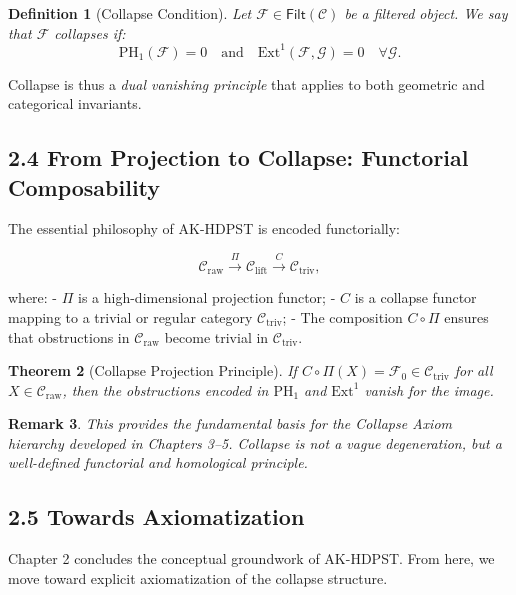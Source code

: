 \documentclass[11pt]{article}
\newtheorem{theorem}{Theorem}[section]
\newtheorem{definition}[theorem]{Definition}
\newtheorem{remark}[theorem]{Remark}
\begin{document}
\begin{definition}[Collapse Condition]
Let \( \mathcal{F} \in \mathsf{Filt}(\mathcal{C}) \) be a filtered object.  
We say that \( \mathcal{F} \) \emph{collapses} if:
\[
\mathrm{PH}_1(\mathcal{F}) = 0 \quad \text{and} \quad \mathrm{Ext}^1(\mathcal{F}, \mathcal{G}) = 0 \quad \forall \mathcal{G}.
\]
\end{definition}

Collapse is thus a \emph{dual vanishing principle} that applies to both geometric and categorical invariants.

\subsection*{2.4 From Projection to Collapse: Functorial Composability}

The essential philosophy of AK-HDPST is encoded functorially:

\[
\mathcal{C}_{\text{raw}} 
\overset{\Pi}{\longrightarrow} 
\mathcal{C}_{\text{lift}} 
\overset{C}{\longrightarrow} 
\mathcal{C}_{\text{triv}},
\]

where:
- \( \Pi \) is a high-dimensional projection functor;
- \( C \) is a collapse functor mapping to a trivial or regular category \( \mathcal{C}_{\text{triv}} \);
- The composition \( C \circ \Pi \) ensures that obstructions in \( \mathcal{C}_{\text{raw}} \) become trivial in \( \mathcal{C}_{\text{triv}} \).

\begin{theorem}[Collapse Projection Principle]
If \( C \circ \Pi(X) = \mathcal{F}_0 \in \mathcal{C}_{\text{triv}} \) for all \( X \in \mathcal{C}_{\text{raw}} \),  
then the obstructions encoded in \( \mathrm{PH}_1 \) and \( \mathrm{Ext}^1 \) vanish for the image.
\end{theorem}

\begin{remark}
This provides the fundamental basis for the Collapse Axiom hierarchy developed in Chapters 3–5.  
Collapse is not a vague degeneration, but a well-defined functorial and homological principle.
\end{remark}

\subsection*{2.5 Towards Axiomatization}

Chapter 2 concludes the conceptual groundwork of AK-HDPST.  
From here, we move toward explicit axiomatization of the collapse structure.
\end{document}
